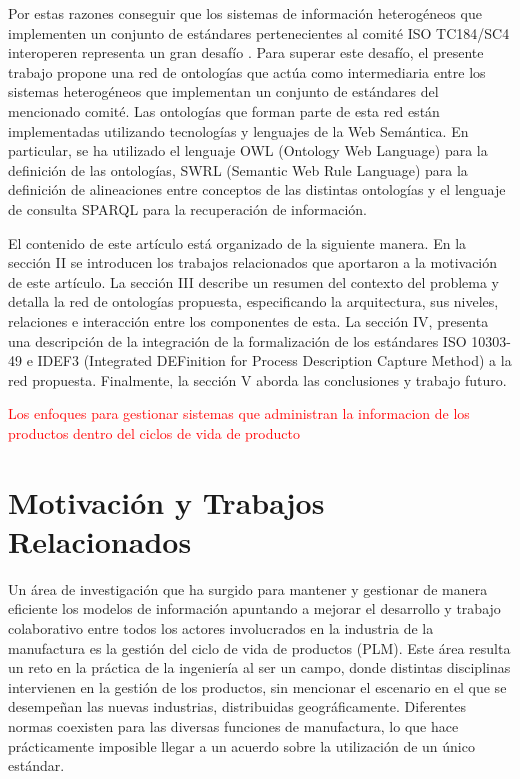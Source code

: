 \documentclass[journal]{IEEEtran}
\begin{document}
Por estas razones conseguir que los sistemas de informaci\'on heterog\'eneos que implementen un conjunto de est\'andares pertenecientes al comit\'e ISO TC184/SC4 interoperen representa un gran desaf\'io \cite{Fortineau2013}. Para superar este desaf\'io, el presente trabajo propone una red de ontolog\'ias que act\'ua como intermediaria entre los sistemas heterog\'eneos que implementan un conjunto de est\'andares del mencionado comit\'e. Las ontolog\'ias que forman parte de esta red est\'an implementadas utilizando tecnolog\'ias y lenguajes de la Web Sem\'antica. En particular, se ha utilizado el lenguaje OWL (Ontology Web Language) para la definici\'on de las ontolog\'ias, SWRL (Semantic Web Rule Language) para la definici\'on de alineaciones entre conceptos de las distintas ontolog\'ias y el lenguaje de consulta SPARQL para la recuperaci\'on de informaci\'on.

El contenido de este art\'iculo est\'a organizado de la siguiente manera. En la secci\'on II se introducen los trabajos relacionados que aportaron a la motivaci\'on de este art\'iculo. La secci\'on III describe un resumen del contexto del problema y detalla la red de ontolog\'ias propuesta, especificando la arquitectura, sus niveles, relaciones e interacci\'on entre los componentes de esta. La secci\'on IV, presenta una descripci\'on de la integraci\'on de la formalizaci\'on de los est\'andares ISO 10303-49 e IDEF3 (Integrated DEFinition for Process Description Capture Method) a la red propuesta. Finalmente, la secci\'on V aborda las conclusiones y trabajo futuro.

\textcolor{red}{Los enfoques para gestionar sistemas que administran la informacion de los productos dentro del ciclos de vida de producto}

\section{Motivaci\'on y Trabajos Relacionados}

Un \'area de investigaci\'on que ha surgido para mantener y gestionar de manera eficiente los modelos de informaci\'on apuntando a mejorar el desarrollo y trabajo colaborativo entre todos los actores involucrados en la industria de la manufactura \cite{Terzi2010} es la gesti\'on del ciclo de vida de productos (PLM). Este \'area resulta un reto en la pr\'actica de la ingenier\'ia al ser un campo, donde distintas disciplinas intervienen en la gesti\'on de los productos, sin mencionar el escenario en el que se desempe\~nan las nuevas industrias, distribuidas geogr\'aficamente. Diferentes normas coexisten para las diversas funciones de manufactura, lo que hace pr\'acticamente imposible llegar a un acuerdo sobre la utilizaci\'on de un \'unico est\'andar. 
\end{document}
